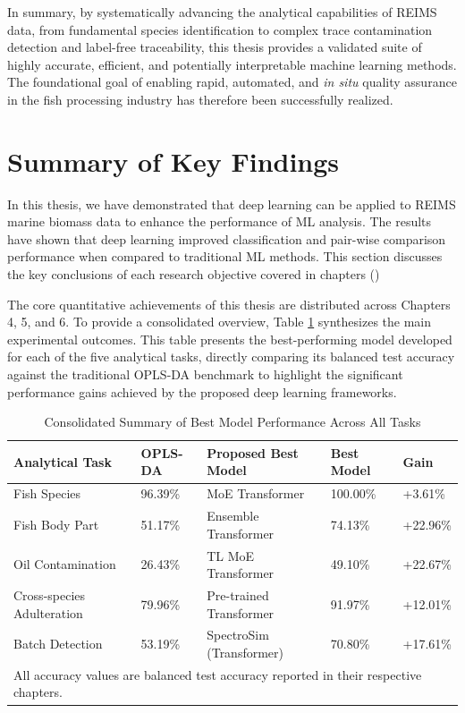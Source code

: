 \vspace{12pt} %

In summary, by systematically advancing the analytical capabilities of REIMS data, from fundamental species identification to complex trace contamination detection and label-free traceability, this thesis provides a validated suite of highly accurate, efficient, and potentially interpretable machine learning methods. The foundational goal of enabling rapid, automated, and \textit{in situ} quality assurance in the fish processing industry has therefore been successfully realized.

\section{Summary of Key Findings}

In this thesis, we have demonstrated that deep learning can be applied to REIMS marine biomass data to enhance the performance of ML analysis. The results have shown that deep learning improved classification and pair-wise comparison performance when compared to traditional ML methods. This section discusses the key conclusions of each research objective covered in chapters ()

The core quantitative achievements of this thesis are distributed across Chapters 4, 5, and 6. To provide a consolidated overview, Table \ref{tab:results_summary} synthesizes the main experimental outcomes. This table presents the best-performing model developed for each of the five analytical tasks, directly comparing its balanced test accuracy against the traditional OPLS-DA benchmark to highlight the significant performance gains achieved by the proposed deep learning frameworks.

\begin{table}[t]
\small 
\centering
\caption{Consolidated Summary of Best Model Performance Across All Tasks}
\label{tab:results_summary}
\begin{tabular}{l l l l l}
\toprule
\textbf{Analytical Task} & \textbf{OPLS-DA} & \textbf{Proposed Best Model} & \textbf{Best Model} & \textbf{Gain} \\
\midrule
Fish Species & 96.39\% & MoE Transformer & 100.00\% & +3.61\% \\
Fish Body Part & 51.17\% & Ensemble Transformer & 74.13\% & +22.96\% \\
Oil Contamination & 26.43\% & TL MoE Transformer & 49.10\% & +22.67\% \\
Cross-species Adulteration & 79.96\% & Pre-trained Transformer & 91.97\% & +12.01\% \\
Batch Detection & 53.19\% & SpectroSim (Transformer) & 70.80\% & +17.61\% \\
\bottomrule
\multicolumn{5}{l}{\footnotesize{All accuracy values are balanced test accuracy reported in their respective chapters.}}
\end{tabular}
\end{table}


